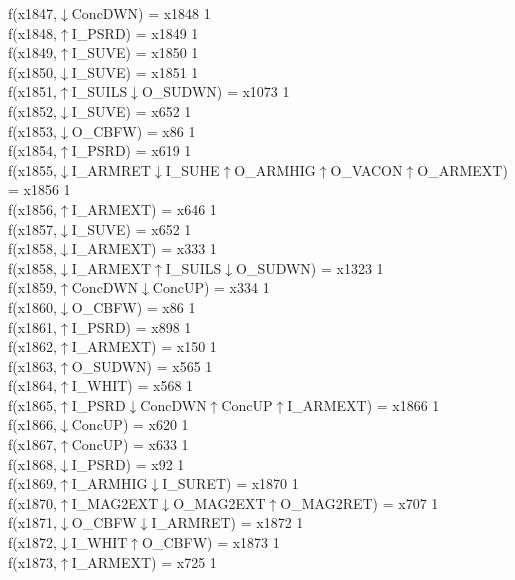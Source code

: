 f(x1847,$\downarrow$ConcDWN) = x1848 {1} \\
f(x1848,$\uparrow$I\_PSRD) = x1849 {1} \\
f(x1849,$\uparrow$I\_SUVE) = x1850 {1} \\
f(x1850,$\downarrow$I\_SUVE) = x1851 {1} \\
f(x1851,$\uparrow$I\_SUILS$\downarrow$O\_SUDWN) = x1073 {1} \\
f(x1852,$\downarrow$I\_SUVE) = x652 {1} \\
f(x1853,$\downarrow$O\_CBFW) = x86 {1} \\
f(x1854,$\uparrow$I\_PSRD) = x619 {1} \\
f(x1855,$\downarrow$I\_ARMRET$\downarrow$I\_SUHE$\uparrow$O\_ARMHIG$\uparrow$O\_VACON$\uparrow$O\_ARMEXT) = x1856 {1} \\
f(x1856,$\uparrow$I\_ARMEXT) = x646 {1} \\
f(x1857,$\downarrow$I\_SUVE) = x652 {1} \\
f(x1858,$\downarrow$I\_ARMEXT) = x333 {1} \\
f(x1858,$\downarrow$I\_ARMEXT$\uparrow$I\_SUILS$\downarrow$O\_SUDWN) = x1323 {1} \\
f(x1859,$\uparrow$ConcDWN$\downarrow$ConcUP) = x334 {1} \\
f(x1860,$\downarrow$O\_CBFW) = x86 {1} \\
f(x1861,$\uparrow$I\_PSRD) = x898 {1} \\
f(x1862,$\uparrow$I\_ARMEXT) = x150 {1} \\
f(x1863,$\uparrow$O\_SUDWN) = x565 {1} \\
f(x1864,$\uparrow$I\_WHIT) = x568 {1} \\
f(x1865,$\uparrow$I\_PSRD$\downarrow$ConcDWN$\uparrow$ConcUP$\uparrow$I\_ARMEXT) = x1866 {1} \\
f(x1866,$\downarrow$ConcUP) = x620 {1} \\
f(x1867,$\uparrow$ConcUP) = x633 {1} \\
f(x1868,$\downarrow$I\_PSRD) = x92 {1} \\
f(x1869,$\uparrow$I\_ARMHIG$\downarrow$I\_SURET) = x1870 {1} \\
f(x1870,$\uparrow$I\_MAG2EXT$\downarrow$O\_MAG2EXT$\uparrow$O\_MAG2RET) = x707 {1} \\
f(x1871,$\downarrow$O\_CBFW$\downarrow$I\_ARMRET) = x1872 {1} \\
f(x1872,$\downarrow$I\_WHIT$\uparrow$O\_CBFW) = x1873 {1} \\
f(x1873,$\uparrow$I\_ARMEXT) = x725 {1} \\
